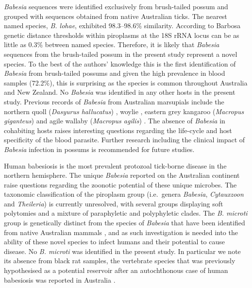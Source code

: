 \documentclass[a4paper, nobind]{templates/ociamthesis}
\begin{document}
\emph{Babesia} sequences were identified exclusively from brush-tailed possum and grouped with sequences obtained from native Australian ticks.
The nearest named species, \emph{B. lohae}, exhibited 98.3--98.6\% similarity.
According to Barbosa \autocite*{barbosaSequenceAnalysesMitochondrial2019} genetic distance thresholds within piroplasms at the 18S rRNA locus can be as little as 0.3\% between named species.
Therefore, it is likely that \emph{Babesia} sequences from the brush-tailed possum in the present study represent a novel species.
To the best of the authors' knowledge this is the first identification of \emph{Babesia} from brush-tailed possums and given the high prevalence in blood samples (72.2\%), this is surprising as the species is common throughout Australia and New Zealand.
No \emph{Babesia} was identified in any other hosts in the present study.
Previous records of \emph{Babesia} from Australian marsupials include the northern quoll (\emph{Dasyurus hallucatus}) \autocite{bangsBabesiaThylacisApicomplexa1996}, woylie \autocite{papariniIdentificationNovelBabesia2012,northoverIncreasedTrypanosomaSpp2019}, eastern grey kangaroo (\emph{Macropus giganteus}) and agile wallaby (\emph{Macropus agilis}) \autocite{donahoeRetrospectiveStudyBabesia2015}.
The absence of \emph{Babesia} in cohabiting hosts raises interesting questions regarding the life-cycle and host specificity of the blood parasite. Further research including the clinical impact of \emph{Babesia} infection in possums is recommended for future studies.

Human babesiosis is the most prevalent protozoal tick-borne disease in the northern hemisphere.
The unique \emph{Babesia} reported on the Australian continent raise questions regarding the zoonotic potential of these unique microbes.
The taxonomic classification of the piroplasm group (i.e.~genera \emph{Babesia}, \emph{Cytauxzoon} and \emph{Theileria}) \autocite{papariniFirstMolecularCharacterization2015,schreegMitochondrialGenomeSequences2016,barbosaSequenceAnalysesMitochondrial2019,jaloveckaBabesiaLifeCycle2019} is currently unresolved, with several groups displaying soft polytomies and a mixture of paraphyletic and polyphyletic clades.
The \emph{B. microti} group is genetically distinct from the species of \emph{Babesia} that have been identified from native Australian mammals \autocite{schreegMitochondrialGenomeSequences2016,barbosaSequenceAnalysesMitochondrial2019}, and as such investigation is needed into the ability of these novel species to infect humans and their potential to cause disease.
No \emph{B. microti} was identified in the present study.
In particular we note its absence from black rat samples, the vertebrate species that was previously hypothesised as a potential reservoir after an autochthonous case of human babesiosis was reported in Australia \autocite{senanayakeFirstReportHuman2012}.
\end{document}

